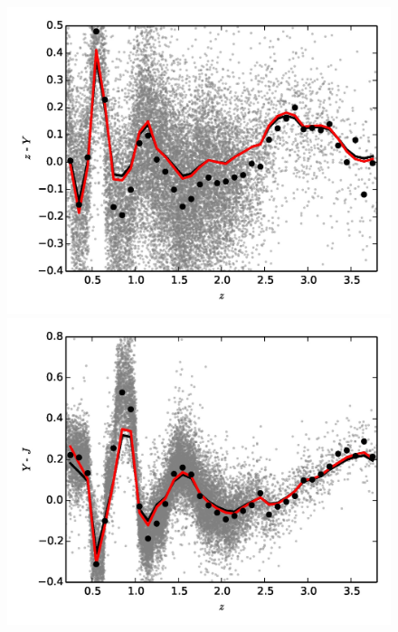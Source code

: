 \begin{figure}
\begin{minipage}[b]{0.49\textwidth}
    \includegraphics[width=\textwidth]{figures/chapter06/zy.jpg}
  \end{minipage}
  \begin{minipage}[b]{0.49\textwidth}
    \includegraphics[width=\textwidth]{figures/chapter06/yj.jpg}
  \end{minipage} 
\end{figure}

